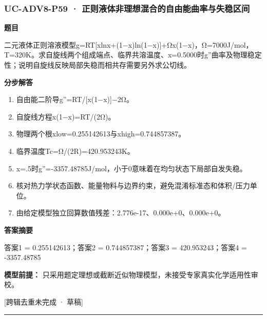 \documentclass[UTF8,11pt,a4paper]{ctexart}
\begin{document}
\subsubsection*{UC-ADV8-P59 · 正则液体非理想混合的自由能曲率与失稳区间}
\noindent\textbf{题目}\par
二元液体正则溶液模型g=RT[xlnx+(1−x)ln(1−x)]+Ωx(1−x)，Ω=7000J/mol，T=320K。求自旋线两个组成端点、临界共溶温度、x=0.5000时g''曲率及物理稳定性；说明自旋线反映局部失稳而相共存需要另外求公切线。\par
\medskip\noindent\textbf{分步解答}
\begin{enumerate}
\item 自由能二阶导g''=RT/[x(1−x)]−2Ω。
\item 自旋线方程x(1−x)=RT/(2Ω)。
\item 物理两个根xlow=0.255142613与xhigh=0.744857387。
\item 临界温度Tc=Ω/(2R)=420.953243K。
\item x=.5时g''=-3357.48785J/mol，小于0意味着在均匀状态下局部自发失稳。
\item 核对热力学状态函数、能量物料与边界约束，避免混淆标准态和体积/压力单位。
\item 由给定模型独立回算数值残差：2.776e-17、0.000e+0、0.000e+0。
\end{enumerate}
\noindent\textbf{答案摘要}\par
答案1 = 0.255142613；答案2 = 0.744857387；答案3 = 420.953243；答案4 = -3357.48785\par
\noindent\textbf{模型前提：}
只采用题定理想或截断近似物理模型，未接受专家真实化学适用性审校。\par
\noindent\textcolor{red!65!black}{[跨辑去重未完成 · 草稿]} \par
\medskip\hrule\medskip
{}
\end{document}
